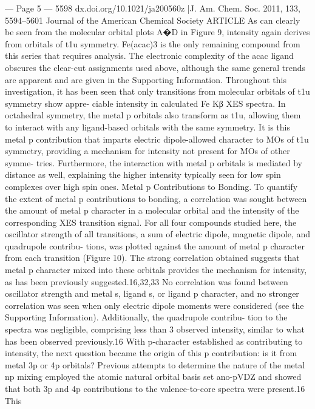 --- Page 5 ---
5598
dx.doi.org/10.1021/ja200560z |J. Am. Chem. Soc. 2011, 133, 5594–5601
Journal of the American Chemical Society
ARTICLE
As can clearly be seen from the molecular orbital plots A�D in
Figure 9, intensity again derives from orbitals of t1u symmetry.
Fe(acac)3 is the only remaining compound from this series
that requires analysis. The electronic complexity of the acac
ligand obscures the clear-cut assignments used above, although
the same general trends are apparent and are given in the
Supporting Information.
Throughout this investigation, it has been seen that only
transitions from molecular orbitals of t1u symmetry show appre-
ciable intensity in calculated Fe Kβ XES spectra. In octahedral
symmetry, the metal p orbitals also transform as t1u, allowing
them to interact with any ligand-based orbitals with the same
symmetry. It is this metal p contribution that imparts electric
dipole-allowed character to MOs of t1u symmetry, providing a
mechanism for intensity not present for MOs of other symme-
tries. Furthermore, the interaction with metal p orbitals is
mediated by distance as well, explaining the higher intensity
typically seen for low spin complexes over high spin ones.
Metal p Contributions to Bonding. To quantify the extent of
metal p contributions to bonding, a correlation was sought between
the amount of metal p character in a molecular orbital and the
intensity of the corresponding XES transition signal. For all four
compounds studied here, the oscillator strength of all transitions, a
sum of electric dipole, magnetic dipole, and quadrupole contribu-
tions, was plotted against the amount of metal p character from each
transition (Figure 10). The strong correlation obtained suggests
that metal p character mixed into these orbitals provides the
mechanism for intensity, as has been previously suggested.16,32,33
No correlation was found between oscillator strength and metal s,
ligand s, or ligand p character, and no stronger correlation was seen
when only electric dipole moments were considered (see the
Supporting Information). Additionally, the quadrupole contribu-
tion to the spectra was negligible, comprising less than 3%
observed intensity, similar to what has been observed previously.16
With p-character established as contributing to intensity, the
next question became the origin of this p contribution: is it from
metal 3p or 4p orbitals? Previous attempts to determine the
nature of the metal np mixing employed the atomic natural
orbital basis set ano-pVDZ and showed that both 3p and 4p
contributions to the valence-to-core spectra were present.16 This
